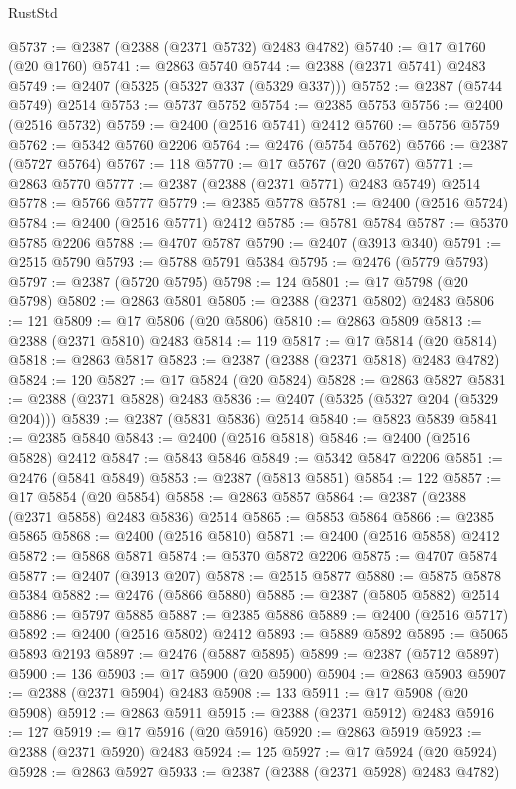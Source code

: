 \begin{lexlean}{RustStd}
\begin{coremodule}
{\begin{coremodule}
{{{{{{{{{{{{{{{{{{{{{{{{{{{{{{{{{{{{{{{{{{{{{{{{{{@5737 := @2387 (@2388 (@2371 @5732) @2483 @4782)
@5740 := @17 @1760 (@20 @1760)
@5741 := @2863 @5740
@5744 := @2388 (@2371 @5741) @2483
@5749 := @2407 (@5325 (@5327 @337 (@5329 @337)))
@5752 := @2387 (@5744 @5749) @2514
@5753 := @5737 @5752
@5754 := @2385 @5753
@5756 := @2400 (@2516 @5732)
@5759 := @2400 (@2516 @5741) @2412
@5760 := @5756 @5759
@5762 := @5342 @5760 @2206
@5764 := @2476 (@5754 @5762)
@5766 := @2387 (@5727 @5764)
@5767 := 118
@5770 := @17 @5767 (@20 @5767)
@5771 := @2863 @5770
@5777 := @2387 (@2388 (@2371 @5771) @2483 @5749) @2514
@5778 := @5766 @5777
@5779 := @2385 @5778
@5781 := @2400 (@2516 @5724)
@5784 := @2400 (@2516 @5771) @2412
@5785 := @5781 @5784
@5787 := @5370 @5785 @2206
@5788 := @4707 @5787
@5790 := @2407 (@3913 @340)
@5791 := @2515 @5790
@5793 := @5788 @5791 @5384
@5795 := @2476 (@5779 @5793)
@5797 := @2387 (@5720 @5795)
@5798 := 124
@5801 := @17 @5798 (@20 @5798)
@5802 := @2863 @5801
@5805 := @2388 (@2371 @5802) @2483
@5806 := 121
@5809 := @17 @5806 (@20 @5806)
@5810 := @2863 @5809
@5813 := @2388 (@2371 @5810) @2483
@5814 := 119
@5817 := @17 @5814 (@20 @5814)
@5818 := @2863 @5817
@5823 := @2387 (@2388 (@2371 @5818) @2483 @4782)
@5824 := 120
@5827 := @17 @5824 (@20 @5824)
@5828 := @2863 @5827
@5831 := @2388 (@2371 @5828) @2483
@5836 := @2407 (@5325 (@5327 @204 (@5329 @204)))
@5839 := @2387 (@5831 @5836) @2514
@5840 := @5823 @5839
@5841 := @2385 @5840
@5843 := @2400 (@2516 @5818)
@5846 := @2400 (@2516 @5828) @2412
@5847 := @5843 @5846
@5849 := @5342 @5847 @2206
@5851 := @2476 (@5841 @5849)
@5853 := @2387 (@5813 @5851)
@5854 := 122
@5857 := @17 @5854 (@20 @5854)
@5858 := @2863 @5857
@5864 := @2387 (@2388 (@2371 @5858) @2483 @5836) @2514
@5865 := @5853 @5864
@5866 := @2385 @5865
@5868 := @2400 (@2516 @5810)
@5871 := @2400 (@2516 @5858) @2412
@5872 := @5868 @5871
@5874 := @5370 @5872 @2206
@5875 := @4707 @5874
@5877 := @2407 (@3913 @207)
@5878 := @2515 @5877
@5880 := @5875 @5878 @5384
@5882 := @2476 (@5866 @5880)
@5885 := @2387 (@5805 @5882) @2514
@5886 := @5797 @5885
@5887 := @2385 @5886
@5889 := @2400 (@2516 @5717)
@5892 := @2400 (@2516 @5802) @2412
@5893 := @5889 @5892
@5895 := @5065 @5893 @2193
@5897 := @2476 (@5887 @5895)
@5899 := @2387 (@5712 @5897)
@5900 := 136
@5903 := @17 @5900 (@20 @5900)
@5904 := @2863 @5903
@5907 := @2388 (@2371 @5904) @2483
@5908 := 133
@5911 := @17 @5908 (@20 @5908)
@5912 := @2863 @5911
@5915 := @2388 (@2371 @5912) @2483
@5916 := 127
@5919 := @17 @5916 (@20 @5916)
@5920 := @2863 @5919
@5923 := @2388 (@2371 @5920) @2483
@5924 := 125
@5927 := @17 @5924 (@20 @5924)
@5928 := @2863 @5927
@5933 := @2387 (@2388 (@2371 @5928) @2483 @4782)
}}}}}}}}}}}}}}}}}}}}}}}}}}}}}}}}}}}}}}}}}}}}}}}}}}
\end{coremodule}}
\end{coremodule}
\end{lexlean}

